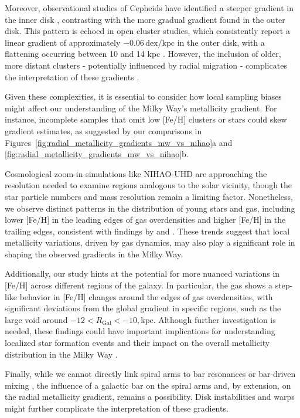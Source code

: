 \documentclass[fleqn,usenatbib]{mnras}
\begin{document}
Moreover, observational studies of Cepheids have identified a steeper gradient in the inner disk \citep[e.g.][]{Andrievsky2002b, Pedicelli2009, Genovali2013}, contrasting with the more gradual gradient found in the outer disk. This pattern is echoed in open cluster studies, which consistently report a linear gradient of approximately $-0.06\,\mathrm{dex/kpc}$ in the outer disk, with a flattening occurring between 10 and 14 kpc \citep{Lemasle2013}. However, the inclusion of older, more distant clusters - potentially influenced by radial migration - complicates the interpretation of these gradients \citep{Magrini2009, Lepine2011}. 

Given these complexities, it is essential to consider how local sampling biases might affect our understanding of the Milky Way's metallicity gradient. For instance, incomplete samples that omit low [Fe/H] clusters or stars could skew gradient estimates, as suggested by our comparisons in Figures~\ref{fig:radial_metallicity_gradients_mw_vs_nihao}a and \ref{fig:radial_metallicity_gradients_mw_vs_nihao}b.

Cosmological zoom-in simulations like NIHAO-UHD are approaching the resolution needed to examine regions analogous to the solar vicinity, though the star particle numbers and mass resolution remain a limiting factor. Nonetheless, we observe distinct patterns in the distribution of young stars and gas, including lower [Fe/H] in the leading edges of gas overdensities and higher [Fe/H] in the trailing edges, consistent with findings by \citet{Grand2016} and \citet{Ho2017c}. These trends suggest that local metallicity variations, driven by gas dynamics, may also play a significant role in shaping the observed gradients in the Milky Way.

Additionally, our study hints at the potential for more nuanced variations in [Fe/H] across different regions of the galaxy. In particular, the gas shows a step-like behavior in [Fe/H] changes around the edges of gas overdensities, with significant deviations from the global gradient in specific regions, such as the large void around $-12 < R_\mathrm{Gal} < -10,\mathrm{kpc}$. Although further investigation is needed, these findings could have important implications for understanding localized star formation events and their impact on the overall metallicity distribution in the Milky Way \citep{Sanchez2014, SanchezBlazquez2014, Ho2015}.

Finally, while we cannot directly link spiral arms to bar resonances or bar-driven mixing \citep[but see][]{Minchev2010, DiMatteo2013}, the influence of a galactic bar on the spiral arms and, by extension, on the radial metallicity gradient, remains a possibility. Disk instabilities and warps might further complicate the interpretation of these gradients.
\end{document}
